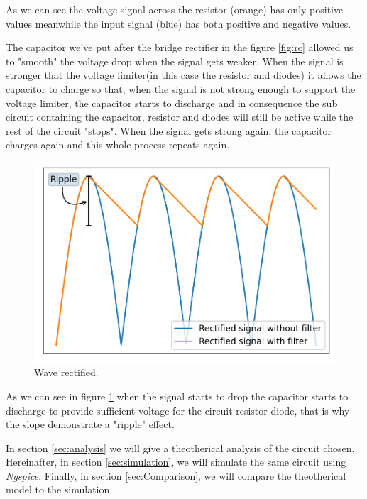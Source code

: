 As we can see the voltage signal across the resistor (orange) has only positive values
meanwhile the input signal (blue) has both positive and negative values.

The capacitor we've put after the bridge rectifier in the figure \ref{fig:rc} allowed us to "smooth"
the voltage drop when the signal gets weaker. When the signal is stronger that the voltage limiter(in this case the resistor and diodes)
it allows the capacitor to charge so that, when the signal is not strong enough to support the voltage limiter, the capacitor
starts to discharge and in consequence the sub circuit containing the capacitor, resistor and diodes will still be
active while the rest of the circuit "stops". When the signal gets strong again, the capacitor charges again and this whole process repeats again.
\begin{figure}[h] \centering
    \includegraphics[scale=0.75]{filter.png}
    \caption{Wave rectified.}
    \label{fig:rc5}
\end{figure}

As we can see in figure \ref{fig:rc5} when the signal starts to drop the capacitor starts to discharge to provide
sufficient voltage for the circuit resistor-diode, that is why the slope demonstrate a "ripple" effect.

In section \ref{sec:analysis} we will give a theotherical analysis of the circuit chosen.
Hereinafter, in section \ref{sec:simulation}, we will simulate the same circuit using \emph{Ngspice}.
Finally, in section \ref{sec:Comparison}, we will compare the theotherical model to the simulation.

